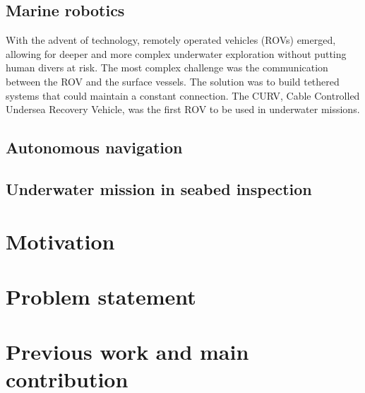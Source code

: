 \subsection{Marine robotics}
With the advent of technology, remotely operated vehicles (ROVs) emerged, allowing for deeper and more complex underwater exploration without putting human divers at risk. The most complex challenge was the communication between the ROV and the surface vessels. The solution was to build tethered systems that could maintain a constant connection.
The CURV, Cable Controlled Undersea Recovery Vehicle, was the first ROV to be used in underwater missions.


\subsection{Autonomous navigation}
\subsection{Underwater mission in seabed inspection}

\section{Motivation}
\section{Problem statement}

\section{Previous work and main contribution} %
